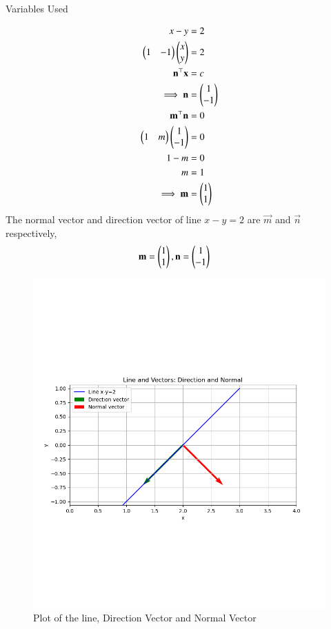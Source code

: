 \documentclass[journal]{IEEEtran}
\begin{document}
\solution
\begin{table}[h!]    
  \centering
  
  \caption{Variables Used}
  \label{tab4.2.10.1}
\end{table}
\begin{align}
    x-y&=2 \\
    \begin{pmatrix}1 & -1\end{pmatrix}\begin{pmatrix}x \\ y\end{pmatrix}&=2 \\
    \mathbf{n}^\top\mathbf{x}&=c \\
    \implies\mathbf{n}&=\begin{pmatrix}1 \\ -1\end{pmatrix} \\
    \mathbf{m}^\top\mathbf{n}&=0 \\
    \begin{pmatrix}1 & m\end{pmatrix}\begin{pmatrix}1 \\ -1\end{pmatrix}&=0 \\
    1-m&=0 \\
    m&=1 \\
    \implies \mathbf{m}&=\begin{pmatrix}1 \\ 1\end{pmatrix}
\end{align}
The normal vector and direction vector of line $x-y=2$ are $\vec{m}$ and $\vec{n}$ respectively,
\begin{align}
    \mathbf{m}&=\begin{pmatrix}1 \\ 1\end{pmatrix}, \mathbf{n}=\begin{pmatrix}1 \\ -1\end{pmatrix}
\end{align}
\begin{figure}[ht!]
	\centering
   	\includegraphics[width=0.8\linewidth]{figs/fig.png}
   	\caption{Plot of the line, Direction Vector and Normal Vector}
\label{Plot}
\end{figure}
\end{document}
